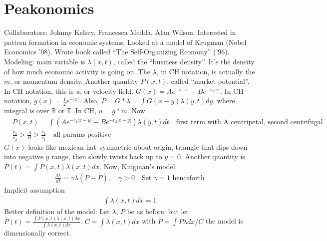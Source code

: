 \documentclass[12pt,reqno]{amsart}
\numberwithin{equation}{section}  %
\newcommand{\rr}{\mathbb{R}}
\newcommand{\ci}{\mathbb{T}}
\begin{document}
\section{Peakonomics} 
\label{sec:peakonomics}
Collaborators: Johnny Kelsey, Francesca Medda, Alan Wilson. Interested in
pattern formation in economic systems. Looked at a model of Krugman (Nobel
Economics '08). Wrote book called ``The Self-Organizing Economy'' ('96).
Modeling: main variable is $\lambda (x,t)$, called the ``business density''.
It's the density of how much economic activity is going on. 
%
%
The $\lambda$, in CH notation,
is actually the $m$, or momentum density. Another quantity
$P(x,t)$, called ``market potential''. In CH notation, this is $u$, or velocity
field. $G(x) = Ae^{-r_{1} | x |} - Be^{-r_{2}| x |}$. In CH notation,
$g(x) = \frac{1}{2}e^{-| x |}$. Also, $P = G* \lambda = \int G(x-y) \lambda
(y,t) dy$, where integral is over $\rr$ or $\ci$. In CH, $u = g*m$.
Now %
%
\begin{equation*}
\begin{split}
  & P(x,t) = \int \left( A e^{-r_{1}| x-y |} - Be^{-r_{2}| x-y |}  \right)
  \lambda(y,t) dt \quad \text{first term with A centripetal, second centrifugal}
  \\
  & \frac{r_{1}}{r_{2}} > \frac{A}{B} > \frac{r_{2}}{r_{1}} \quad \text{all
  params positive}
\end{split}
\end{equation*}
%
%
$G(x)$ looks like mexican hat--symmetric about origin, triangle that dips down
into negative $y$ range, then slowly twists back up to $y=0$. Another quantity
is $\bar{P}(t) = \int P(x,t) \lambda(x,t) dx$. Now, Knigman's model:
%
%
\begin{equation*}
\begin{split}
  \frac{d \lambda}{dt} = \gamma \lambda (P - \bar{P}), \quad \gamma >0 \quad
  \text{Set $\gamma=1$ henceforth}
\end{split}
\end{equation*}
%
%
Implicit assumption
%
%
\begin{equation*}
\begin{split}
\int \lambda(x,t)dx=1
\end{split}
\end{equation*}
%
%
Better definition of the model: Let $\lambda$, $P$ be as before, but let
$\bar{P}(t) = \frac{\int P(x,t) \lambda(x,t)dx}{\int \lambda(x,t)dx}$.
$C = \int \lambda(x,t) dx$ with $\bar{P} = \int P \lambda dx / C$ the model is
dimensionally correct.
%
%
%
%
\end{document}
